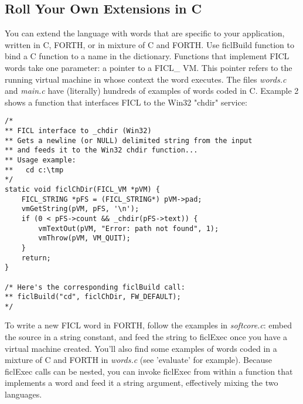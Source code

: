 \subsection{Roll Your Own Extensions in C}
You can extend the language with words that are specific to your
application, written in C, FORTH, or in mixture of C and FORTH. Use
ficlBuild function to bind a C function to a name in the dictionary.
Functions that implement FICL words take one parameter: a pointer to a
FICL\_ VM. This pointer refers to the running virtual machine in whose
context the word executes. The files \textit{words.c} and \textit{main.c}
have (literally) hundreds of examples of words coded in C. Example 2
shows a function that interfaces FICL to the Win32 "chdir" service:
\begin{lstlisting}[frame=single]
/*
** FICL interface to _chdir (Win32)
** Gets a newline (or NULL) delimited string from the input
** and feeds it to the Win32 chdir function...
** Usage example:
**   cd c:\tmp
*/
static void ficlChDir(FICL_VM *pVM) {
	FICL_STRING *pFS = (FICL_STRING*) pVM->pad;
	vmGetString(pVM, pFS, '\n');
	if (0 < pFS->count && _chdir(pFS->text)) {
		vmTextOut(pVM, "Error: path not found", 1);
		vmThrow(pVM, VM_QUIT);
	}
	return;
}

/* Here's the corresponding ficlBuild call:
** ficlBuild("cd", ficlChDir, FW_DEFAULT);
*/
\end{lstlisting}
To write a new FICL word in FORTH, follow the examples in
\textit{softcore.c}: embed the source in a string constant, and feed the
string to ficlExec once you have a virtual machine created. You'll also
find some examples of words coded in a mixture of C and FORTH in
\textit{words.c} (see 'evaluate' for example). Because ficlExec calls
can be nested, you can invoke ficlExec from within a function that
implements a word and feed it a string argument, effectively mixing the
two languages.

